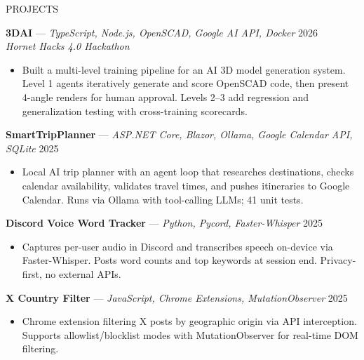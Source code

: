 \documentclass{resume}
\begin{document}

\begin{rSection}{PROJECTS}

\textbf{3DAI} --- \textit{TypeScript, Node.js, OpenSCAD, Google AI API, Docker} \hfill 2026 \\
\textit{Hornet Hacks 4.0 Hackathon}
\begin{itemize}
    \item Built a multi-level training pipeline for an AI 3D model generation system. Level 1 agents iteratively generate and score OpenSCAD code, then present 4-angle renders for human approval. Levels 2--3 add regression and generalization testing with cross-training scorecards.
\end{itemize}

\textbf{SmartTripPlanner} --- \textit{ASP.NET Core, Blazor, Ollama, Google Calendar API, SQLite} \hfill 2025
\begin{itemize}
    \item Local AI trip planner with an agent loop that researches destinations, checks calendar availability, validates travel times, and pushes itineraries to Google Calendar. Runs via Ollama with tool-calling LLMs; 41 unit tests.
\end{itemize}

\textbf{Discord Voice Word Tracker} --- \textit{Python, Pycord, Faster-Whisper} \hfill 2025
\begin{itemize}
    \item Captures per-user audio in Discord and transcribes speech on-device via Faster-Whisper. Posts word counts and top keywords at session end. Privacy-first, no external APIs.
\end{itemize}

\textbf{X Country Filter} --- \textit{JavaScript, Chrome Extensions, MutationObserver} \hfill 2025
\begin{itemize}
    \item Chrome extension filtering X posts by geographic origin via API interception. Supports allowlist/blocklist modes with MutationObserver for real-time DOM filtering.
\end{itemize}

\end{rSection}

\end{document}
